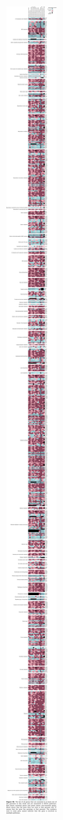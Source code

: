 \documentclass{article}
\newcommand{\Newpage}{\end{preview}\begin{preview}}
\begin{document}
\begin{preview}
\Newpage
\includegraphics{suppl8.pdf}
\Newpage

\end{preview}
\end{document}
